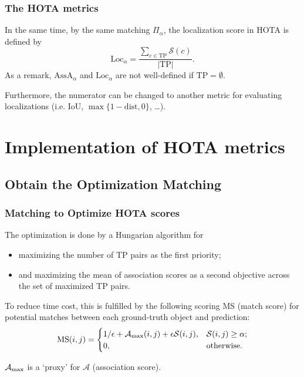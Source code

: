 \documentclass[slidetop, mathserif]{beamer}
\begin{document}
\begin{frame}
	\frametitle{The HOTA metrics}
		
	In the same time, by the same matching $\Pi_\alpha$,
	the localization score in HOTA is defined by
	\[
		\text{Loc}_\alpha = \dfrac{\sum_{c\in\text{TP}} \mathcal S(c)}{|\text{TP}|}.
	\]
	As a remark, $\text{AssA}_\alpha$ and $\text{Loc}_\alpha$ are not well-defined
	if $\text{TP} = \emptyset$.

	\vspace{4pt}

	Furthermore, the numerator can be changed to another metric for evaluating localizations
	(i.e. IoU, $\max\{1-\text{dist},0\}$, \ldots).
		
\end{frame}

\section{Implementation of HOTA metrics}

\subsection{Obtain the Optimization Matching}

\begin{frame}
	\frametitle{Matching to Optimize HOTA scores}
	
	The optimization is done by a Hungarian algorithm for
	\begin{itemize}
		\item maximizing the number of TP pairs as the first priority;
		\item and maximizing the mean of association scores
		      as a second objective across the set of maximized TP pairs.
	\end{itemize}
	
	To reduce time cost, this is fulfilled by the following scoring MS (match score) for
	potential matches between each ground-truth object and prediction:
	\[
		\text{MS}(i,j) =
		\begin{cases}
			1/\epsilon + \mathcal A_{\rm max}(i,j) + \epsilon\mathcal S(i,j), & \mathcal S(i,j) \geq \alpha; \\
			0,                                                                & \text{otherwise}.            
		\end{cases}
	\]
	
	\vspace{-5pt}
	$\mathcal A_{\rm max}$ is a `proxy' for $\mathcal A$ (association score).
	
\end{frame}
\end{document}
